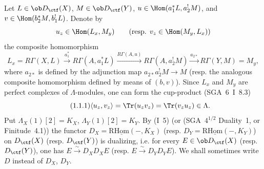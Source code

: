 Let $L\in \ob D_{\ctf}(X)$, $M\in \ob D_{\ctf}(Y)$, $u\in\Hom(a_1^*L,a_2^!M)$, and $v\in\Hom(b_2^*M,b_1^!L)$. Denote by
\[
u_z\in\Hom(L_x,M_y)\qquad (\text{resp. }v_z\in\Hom(M_y,L_x))
\]
the composite homomorphism
\[
L_x=R\Gamma(X,L)\xrightarrow{a_1^*}R\Gamma(A,a_1^*L)
\xrightarrow{R\Gamma(A,u)}R\Gamma(A,a_2^!M)
\xrightarrow{a_{2*}}R\Gamma(Y,M)=M_y,
\]
where $a_{2*}$ is defined by the adjunction map $a_{2*}a_2^!M\to M$ (resp. the analogous composite homomorphism defined by means of $(b,v)$). Since $L_x$ and $M_y$ are perfect complexes of $\Lambda$-modules, one can form the cup-product (SGA~6~I~8.3)
\begin{equation}\tag{1.1.1}
\langle u_z,v_z\rangle=\Tr(u_zv_z)=\Tr(v_zu_z)\in\Lambda.
\end{equation}
Put $\Lambda_X(1)[2]=K_X$, $\Lambda_Y(1)[2]=K_Y$. By (I~5) (or (SGA~$4^{1/2}$ Duality~1, or Finitude~4.1)) the functor $D_X=\mathrm{R}\underline{\mathrm{Hom}}(-,K_X)$ (resp. $D_Y=\mathrm{R}\underline{\mathrm{Hom}}(-,K_Y)$) on %
$D_{\ctf}(X)$ (resp. $D_{\ctf}(Y)$) is dualizing, i.e. for every $E\in\ob D_{\ctf}(X)$ (resp. $D_{\ctf}(Y)$), one has $E\xrightarrow{\sim}D_XD_XE$ (resp. $E\xrightarrow{\sim}D_YD_YE$). We shall sometimes write $D$ instead of $D_X$, $D_Y$.

